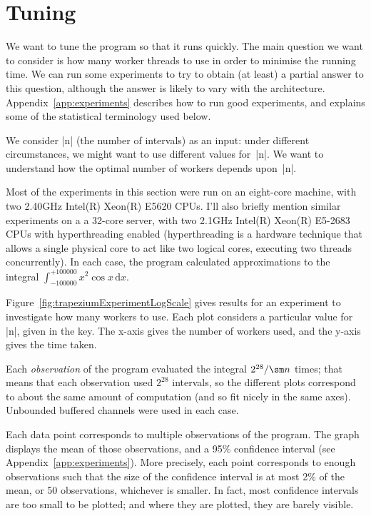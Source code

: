 \section{Tuning}


We want to tune the program so that it runs quickly.  The main question we
want to consider is how many worker threads to use in order to minimise the
running time.
We can run some experiments to try to obtain (at least) a partial answer to
this question, although the answer is likely to vary with the architecture.
%
Appendix~\ref{app:experiments} describes how to run good experiments, and
explains some of the statistical terminology used below. 

We consider |n| (the number of intervals) as an input: under different
circumstances, we might want to use different values for~|n|.  We want to
understand how the optimal number of workers depends upon~|n|.

Most of the experiments in this section were run on an eight-core machine, with
two 2.40GHz Intel(R) Xeon(R) E5620 CPUs.
%
I'll also briefly mention similar experiments on a a 32-core server, with two
2.1GHz Intel(R) Xeon(R) E5-2683 CPUs with hyperthreading enabled
(hyperthreading is a hardware technique that allows a single physical core to
act like two logical cores, executing two threads concurrently).
%
In each case, the program calculated approximations to the integral 
$\int_{-100000}^{+100000} x^2 \cos x \, \mbox{d}x$.


Figure~\ref{fig:trapeziumExperimentLogScale} gives results for an experiment
to investigate how many workers to use.  
%
Each plot considers a particular value for |n|, given in the key.
%
The x-axis gives the number of workers used, and the y-axis gives the time
taken.  

Each \emph{observation} of the program evaluated the integral $2^{28}/\sm n$
times; that means that each observation used $2^{28}$ intervals, so the
different plots correspond to about the same amount of computation (and so fit
nicely in the same axes).  Unbounded buffered channels were used in each case.

Each data point corresponds to multiple observations of the program.  The
graph displays the mean of those observations, and a 95\% confidence interval
(see Appendix~\ref{app:experiments}).  More precisely, each point corresponds
to enough observations such that the size of the confidence interval is at
most 2\% of the mean, or 50 observations, whichever is smaller.  In fact, most
confidence intervals are too small to be plotted; and where they are plotted,
they are barely visible.

